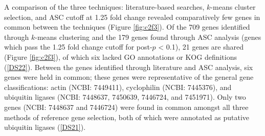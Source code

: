 A comparison of the three techniques: literature-based searches, $k$-means cluster selection, and ASC cutoff at 1.25 fold change revealed comparatively few genes in common between the techniques (Figure \ref{fig:c2f3}). Of the 709 genes identified through $k$-means clustering and the 179 genes found through ASC analysis (genes which pass the 1.25 fold change cutoff for post-$p$ < 0.1), 21 genes are shared (Figure \ref{fig:c2f3}), of which six lacked GO annotations or KOG definitions (\ref{DS22}). Between the genes identified through literature and ASC analysis, six genes were held in common; these genes were representative of the general gene classifications: actin (NCBI: 7449411), cyclophilin (NCBI: 7445376), and ubiquitin ligases (NCBI: 7448637, 7450639, 7446724, and 7451971). Only two genes (NCBI: 7448637 and 7446724) were found in common amongst all three methods of reference gene selection, both of which were annotated as putative ubiquitin ligases (\ref{DS21}). \par



